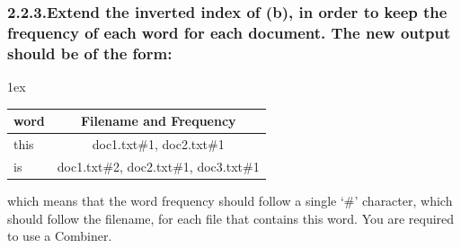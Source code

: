 \documentclass{article}
\begin{document}
\subsubsection{2.2.3.\hspace*{0.5em}Extend the inverted index of (b), in order to keep the frequency of each word for each document. The new output should be of the form:}\label{sec-extend-the-inverted-index-of-b-in-order-to-keep-the-frequency-of-each-word-for-each-document-the-new-output-should-be-of-the-form-}%
\begin{mdtabular}{2}{}{1ex}%
\begin{tabular}{lc}\midrule
\multicolumn{1}{|c}{{\bfseries word}}&\multicolumn{1}{c|}{{\bfseries Filename and Frequency}}\\

\midrule
\multicolumn{1}{|l}{this}&\multicolumn{1}{c|}{doc1.txt\#1, doc2.txt\#1}\\
\multicolumn{1}{|l}{is}&\multicolumn{1}{c|}{doc1.txt\#2, doc2.txt\#1, doc3.txt\#1}\\
\midrule
\end{tabular}\end{mdtabular}

\noindent which means that the word frequency should follow a single ‘\#’ character, which should follow the filename, for each file that contains this word. You are required to use a Combiner.%
\end{document}
